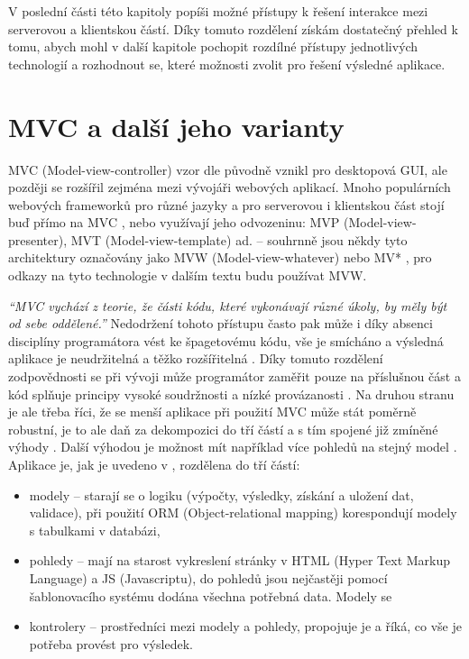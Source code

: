 V poslední části této kapitoly popíši možné přístupy k řešení interakce mezi serverovou a klientskou částí. Díky tomuto rozdělení získám dostatečný přehled k tomu, abych mohl v další kapitole pochopit rozdílné přístupy jednotlivých technologií a rozhodnout se, které možnosti zvolit pro řešení výsledné aplikace.

    \section{MVC a další jeho varianty}\label{mvc}
    MVC (Model-view-controller) vzor dle \cite{mvc-cz1} původně vznikl pro desktopová GUI, ale později se rozšířil zejména mezi vývojáři webových aplikací. Mnoho populárních webových frameworků pro různé jazyky a pro serverovou i klientskou část stojí buď přímo na MVC \cite{mvc-cz1}, nebo využívají jeho odvozeninu: MVP (Model-view-presenter), MVT (Model-view-template) ad. -- souhrnně jsou někdy tyto architektury označovány jako MVW (Model-view-whatever) nebo MV* \cite{mvw}, pro odkazy na tyto technologie v dalším textu budu používat MVW.
    
    \textit{\enquote{MVC vychází z teorie, že části kódu, které vykonávají různé úkoly, by měly být od sebe oddělené.}} \cite{mvc-cz2} Nedodržení tohoto přístupu často pak může i díky absenci disciplíny programátora vést ke špagetovému kódu, vše je smícháno a výsledná aplikace je neudržitelná a těžko rozšířitelná \cite{mvc-cz2}\cite{mvc-2}. Díky tomuto rozdělení zodpovědnosti se při vývoji může programátor zaměřit pouze na příslušnou část a kód splňuje principy vysoké soudržnosti a nízké provázanosti \cite{mvc-medium1}. Na druhou stranu je ale třeba říci, že se menší aplikace při použití MVC může stát poměrně robustní, je to ale daň za dekompozici do tří částí a s tím spojené již zmíněné výhody \cite{mvc-medium1}. Další výhodou je možnost mít například více pohledů na stejný model \cite{mvc-1}. Aplikace je, jak je uvedeno v \cite{mvc-cz2}, rozdělena do tří částí:
    \begin{itemize}
        \item modely -- starají se o logiku (výpočty, výsledky, získání a uložení dat, validace), při použití ORM (Object-relational mapping) korespondují modely s tabulkami v databázi,
        \item pohledy -- mají na starost vykreslení stránky v HTML (Hyper Text Markup Language) a JS (Javascriptu), do pohledů jsou nejčastěji pomocí šablonovacího systému dodána všechna potřebná data. Modely se 
        \item kontrolery -- prostředníci mezi modely a pohledy, propojuje je a říká, co vše je potřeba provést pro výsledek.
    \end{itemize}
    
